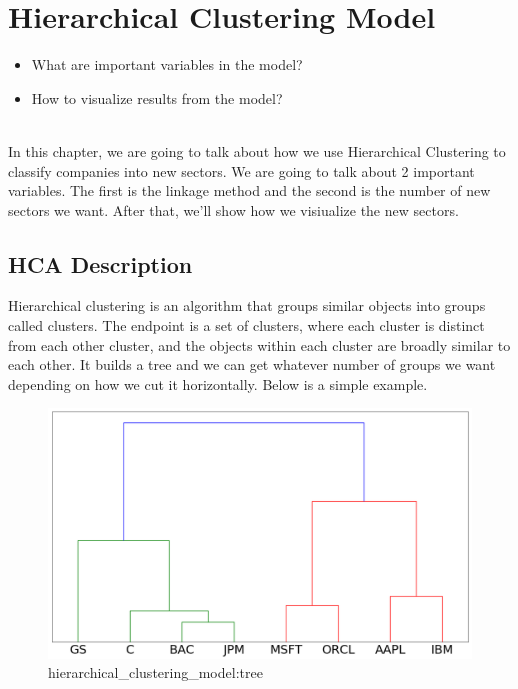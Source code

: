 \documentclass[../main.tex]{subfiles}
\begin{document}
\chapter{Hierarchical Clustering Model}

\begin{itemize}
    \item What are important variables in the model?
    \item How to visualize results from the model?
    \\~\\
\end{itemize}

In this chapter, we are going to talk about how we use Hierarchical Clustering to classify companies into new sectors. We are going to talk about 2 important variables. The first is the linkage method and the second is the number of new sectors we want. After that, we'll show how we visiualize the new sectors.

\section{HCA Description}

Hierarchical clustering is an algorithm that groups similar objects into groups called clusters. The endpoint is a set of clusters, where each cluster is distinct from each other cluster, and the objects within each cluster are broadly similar to each other. It builds a tree and we can get whatever number of groups we want depending on how we cut it horizontally. Below is a simple example.

\begin{figure}[H]
    \centering
    \includegraphics[scale=0.4]{images/tree.png}
    \caption{hierarchical_clustering_model:tree}
    \label{fig:hierarchical_clustering_model:tree}
\end{figure}
\end{document}
